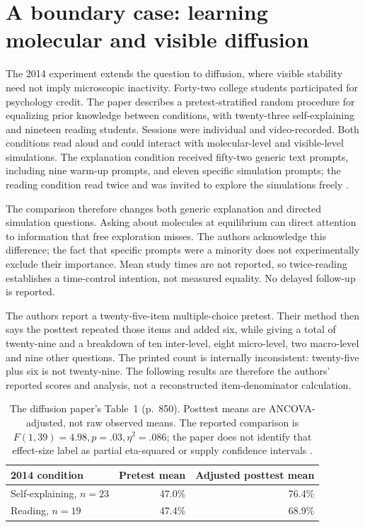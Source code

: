 \section{A boundary case: learning molecular and visible diffusion}
\label{sec:p19-self-explanation-diffusion}

The 2014 experiment extends the question to diffusion, where visible
stability need not imply microscopic inactivity. Forty-two college students
participated for psychology credit. The paper describes a pretest-stratified
random procedure for equalizing prior knowledge between conditions, with
twenty-three self-explaining and nineteen reading students. Sessions were
individual and video-recorded.
Both conditions read aloud and could interact with molecular-level and
visible-level simulations. The explanation condition received fifty-two
generic text prompts, including nine warm-up prompts, and eleven specific
simulation prompts; the reading condition read twice and was invited to
explore the simulations freely
\cite[pp.~849--850]{MuldnerBurlesonChi2014Emergent}.

The comparison therefore changes both generic explanation and directed
simulation questions. Asking about molecules at equilibrium can direct
attention to information that free exploration misses. The authors
acknowledge this difference; the fact that specific prompts were a minority
does not experimentally exclude their importance. Mean study times are not
reported, so twice-reading establishes a time-control intention, not measured
equality. No delayed follow-up is reported.

The authors report a twenty-five-item multiple-choice pretest. Their method
then says the posttest repeated those items and added six, while giving a
total of twenty-nine and a breakdown of ten inter-level, eight micro-level,
two macro-level and nine other questions. The printed count is internally
inconsistent: twenty-five plus six is not twenty-nine. The following results
are therefore the authors' reported scores and analysis, not a reconstructed
item-denominator calculation.

\begin{table}[htbp]
\centering
\small
\begin{tabular}{p{.39\linewidth}rr}
\hline
2014 condition & Pretest mean & Adjusted posttest mean\\
\hline
Self-explaining, \(n=23\) & 47.0\% & 76.4\%\\
Reading, \(n=19\) & 47.4\% & 68.9\%\\
\hline
\end{tabular}
\caption{The diffusion paper's Table~1 (p.~850). Posttest means are
ANCOVA-adjusted, not raw observed means. The reported comparison is
\(F(1,39)=4.98,p=.03,\eta^2=.086\); the paper does not identify that
effect-size label as partial eta-squared or supply confidence intervals
\cite{MuldnerBurlesonChi2014Emergent}.}
\label{tab:p19-self-explanation-diffusion}
\end{table}

